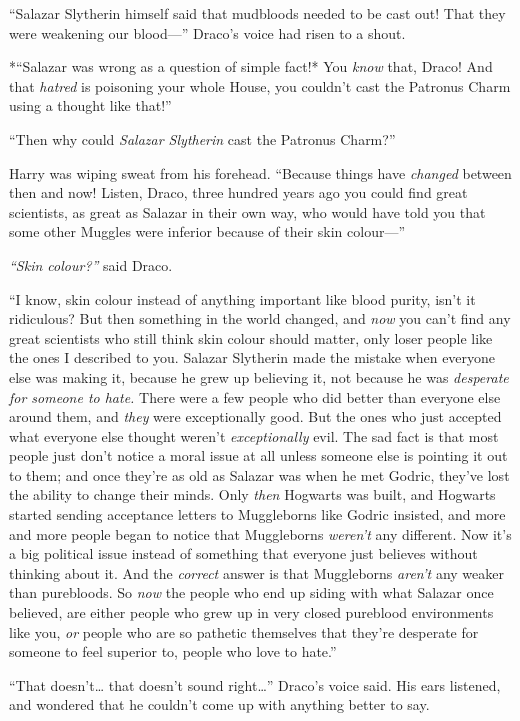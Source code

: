 ``Salazar Slytherin himself said that mudbloods needed to be cast out!
That they were weakening our blood---'' Draco's voice had risen to a
shout.

*``Salazar was wrong as a question of simple fact!* You \emph{know}
that, Draco! And that \emph{hatred} is poisoning your whole House, you
couldn't cast the Patronus Charm using a thought like that!''

``Then why could \emph{Salazar Slytherin} cast the Patronus Charm?''

Harry was wiping sweat from his forehead. ``Because things have
\emph{changed} between then and now! Listen, Draco, three hundred years
ago you could find great scientists, as great as Salazar in their own
way, who would have told you that some other Muggles were inferior
because of their skin colour---''

\emph{``Skin colour?''} said Draco.

``I know, skin colour instead of anything important like blood purity,
isn't it ridiculous? But then something in the world changed, and
\emph{now} you can't find any great scientists who still think skin
colour should matter, only loser people like the ones I described to
you. Salazar Slytherin made the mistake when everyone else was making
it, because he grew up believing it, not because he was \emph{desperate
for someone to hate.} There were a few people who did better than
everyone else around them, and \emph{they} were exceptionally good. But
the ones who just accepted what everyone else thought weren't
\emph{exceptionally} evil. The sad fact is that most people just don't
notice a moral issue at all unless someone else is pointing it out to
them; and once they're as old as Salazar was when he met Godric, they've
lost the ability to change their minds. Only \emph{then} Hogwarts was
built, and Hogwarts started sending acceptance letters to Muggleborns
like Godric insisted, and more and more people began to notice that
Muggleborns \emph{weren't} any different. Now it's a big political issue
instead of something that everyone just believes without thinking about
it. And the \emph{correct} answer is that Muggleborns \emph{aren't} any
weaker than purebloods. So \emph{now} the people who end up siding with
what Salazar once believed, are either people who grew up in very closed
pureblood environments like you, \emph{or} people who are so pathetic
themselves that they're desperate for someone to feel superior to,
people who love to hate.''

``That doesn't\ldots{} that doesn't sound right\ldots{}'' Draco's voice
said. His ears listened, and wondered that he couldn't come up with
anything better to say.

